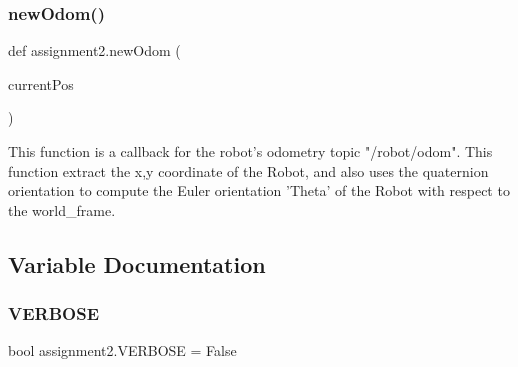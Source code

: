 \subsubsection{new\+Odom()}
{\footnotesize\ttfamily def assignment2.\+new\+Odom (\begin{DoxyParamCaption}\item[{}]{current\+Pos }\end{DoxyParamCaption})}

\begin{DoxyVerb}This function is a callback for the robot's odometry topic "/robot/odom".
This function extract the x,y coordinate of the Robot, and also uses the quaternion orientation to compute the Euler orientation 'Theta' of the Robot with respect to the world_frame.
\end{DoxyVerb}
 

\subsection{Variable Documentation}
\mbox{\label{namespaceassignment2_aa828aa1b9cc2faaed121fa44161cae60}} 
\subsubsection{V\+E\+R\+B\+O\+SE}
{\footnotesize\ttfamily bool assignment2.\+V\+E\+R\+B\+O\+SE = False}

